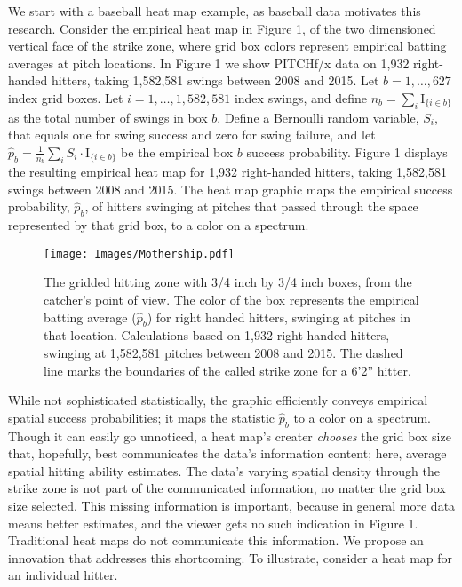 \documentclass{article}
\begin{document}
We start with a baseball heat map example, as baseball data motivates this research. Consider the empirical heat map in Figure 1, of the two dimensioned vertical face of the strike zone, where grid box colors represent empirical batting averages at pitch locations. In Figure 1 we show PITCHf/x\textsuperscript{\textregistered} data on 1,932 right-handed hitters, taking 1,582,581 swings between 2008 and 2015.  Let $b = 1, \dots, 627$ index grid boxes. Let $i = 1, \dots, 1,582,581$ index swings, and define $n_{b} = \displaystyle\sum_{i} \text{I}_{\{i \in b \}}$ as the total number of swings in box $b$.
Define a Bernoulli random variable, $S_{i}$, that equals one for swing success and zero for swing failure, and let $\hat{p}_{b} = \frac{1}{n_{b}} \displaystyle\sum_{i} S_{i} \cdot \text{I}_{\{i \in b \}}$ be the empirical box $b$ success probability. Figure 1 displays the resulting empirical heat map for 1,932 right-handed hitters, taking 1,582,581 swings between 2008 and 2015. The heat map graphic maps the empirical success probability, $\hat{p}_{b}$, of hitters swinging at pitches that passed through the space represented by that grid box, to a color on a spectrum.
  \begin{figure}[H]
	\centering
	\texttt{[image: Images/Mothership.pdf]} 
  \caption{The gridded hitting zone with 3/4 inch by 3/4 inch boxes, from the catcher's point of view. The color of the box represents the empirical batting average ($\hat{p}_{b}$) for right handed hitters, swinging at pitches in that location. Calculations based on 1,932 right handed hitters, swinging at 1,582,581 pitches between 2008 and 2015. The dashed line marks the boundaries of the called strike zone for a 6'2'' hitter.}
	\end{figure} 
\noindent While not sophisticated statistically, the graphic efficiently conveys empirical spatial success probabilities; it maps the statistic $\hat{p}_{b}$ to a color on a spectrum. Though it can easily go unnoticed, a heat map's creater {\it chooses} the grid box size that, hopefully, best communicates the data's information content; here, average spatial hitting ability estimates. The data's varying spatial density through the strike zone is not part of the communicated information, no matter the grid box size selected. This missing information is important, because in general more data means better estimates, and the viewer gets no such indication in Figure 1. Traditional heat maps do not communicate this information. We propose an innovation that addresses this shortcoming. To illustrate, consider a heat map for an individual hitter.
\end{document}
